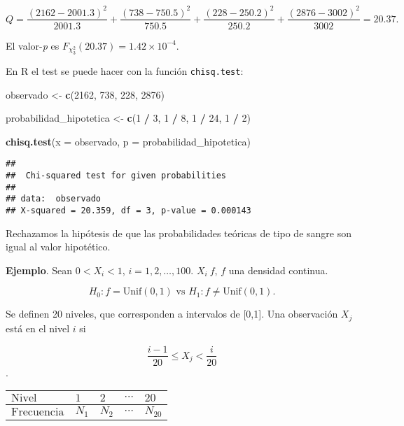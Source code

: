 \documentclass[
  12pt,
]{book}
\newenvironment{Shaded}{\begin{snugshade}}{\end{snugshade}}
\newcommand{\DataTypeTok}[1]{\textcolor[rgb]{0.13,0.29,0.53}{#1}}
\newcommand{\DecValTok}[1]{\textcolor[rgb]{0.00,0.00,0.81}{#1}}
\newcommand{\KeywordTok}[1]{\textcolor[rgb]{0.13,0.29,0.53}{\textbf{#1}}}
\newcommand{\NormalTok}[1]{#1}
\newcommand{\OperatorTok}[1]{\textcolor[rgb]{0.81,0.36,0.00}{\textbf{#1}}}
\newcommand{\StringTok}[1]{\textcolor[rgb]{0.31,0.60,0.02}{#1}}
\begin{document}
\[Q = \dfrac{(2162-2001.3)^2}{2001.3} + \dfrac{(738-750.5)^2}{750.5} + \dfrac{(228-250.2)^2}{250.2} + \dfrac{(2876-3002)^2}{3002} = 20.37.\]

El valor-\emph{p} es \(F_{\chi^2_{3}}(20.37) = 1.42\times 10^{-4}\).

En R el test se puede hacer con la función \texttt{chisq.test}:

\begin{Shaded}
\begin{Highlighting}[]
\NormalTok{observado \textless{}{-}}\StringTok{ }\KeywordTok{c}\NormalTok{(}\DecValTok{2162}\NormalTok{, }\DecValTok{738}\NormalTok{, }\DecValTok{228}\NormalTok{, }\DecValTok{2876}\NormalTok{)}

\NormalTok{probabilidad\_hipotetica \textless{}{-}}\StringTok{ }\KeywordTok{c}\NormalTok{(}\DecValTok{1} \OperatorTok{/}\StringTok{ }\DecValTok{3}\NormalTok{, }\DecValTok{1} \OperatorTok{/}\StringTok{ }\DecValTok{8}\NormalTok{, }\DecValTok{1} \OperatorTok{/}\StringTok{ }\DecValTok{24}\NormalTok{, }\DecValTok{1} \OperatorTok{/}\StringTok{ }\DecValTok{2}\NormalTok{)}

\KeywordTok{chisq.test}\NormalTok{(}\DataTypeTok{x =}\NormalTok{ observado, }\DataTypeTok{p =}\NormalTok{ probabilidad\_hipotetica)}
\end{Highlighting}
\end{Shaded}

\begin{verbatim}
## 
##  Chi-squared test for given probabilities
## 
## data:  observado
## X-squared = 20.359, df = 3, p-value = 0.000143
\end{verbatim}

Rechazamos la hipótesis de que las probabilidades teóricas de tipo de sangre son
igual al valor hipotético.

\textbf{Ejemplo}. Sean \(0<X_i<1\), \(i=1,2,\dots,100\). \(X_i~f\), \(f\) una densidad continua.

\[H_0: f=\text{Unif}(0,1) \text{ vs } H_1: f \ne\text{Unif}(0,1). \]

Se definen 20 niveles, que corresponden a intervalos de {[}0,1{]}. Una observación
\(X_j\) está en el nivel \(i\) si

\[\dfrac{i-1}{20}\leq X_j <\dfrac{i}{20}\].

\begin{longtable}[]{@{}lllll@{}}
\toprule
\(\text{Nivel}\) & \(1\) & \(2\) & \(\cdots\) & \(20\)\tabularnewline
\midrule
\endhead
\(\text{Frecuencia}\) & \(N_1\) & \(N_2\) & \(\cdots\) & \(N_{20}\)\tabularnewline
\bottomrule
\end{longtable}
\end{document}
